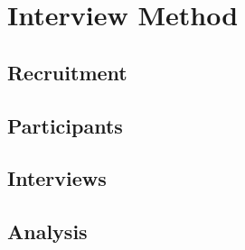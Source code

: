 \section{Interview Method}\label{Method}

\subsection{Recruitment}

\subsection{Participants}

\subsection{Interviews}

\subsection{Analysis}
